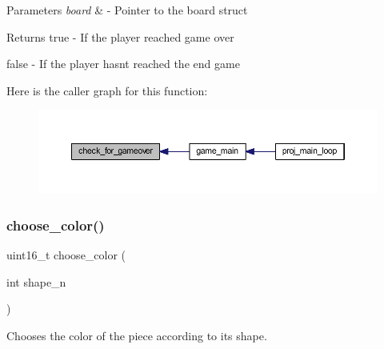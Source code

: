 \begin{DoxyParams}{Parameters}
{\em board} & -\/ Pointer to the board struct \\
\hline
\end{DoxyParams}
\begin{DoxyReturn}{Returns}
true -\/ If the player reached game over 

false -\/ If the player hasn\textquotesingle{}t reached the end game 
\end{DoxyReturn}
Here is the caller graph for this function\+:
\nopagebreak
\begin{figure}[H]
\begin{center}
\leavevmode
\includegraphics[width=350pt]{group__tetramino_gaed055860f4584eb217234f06c29d3ab4_icgraph}
\end{center}
\end{figure}
\mbox{\label{group__tetramino_gaec1f53f8b300eba51c8863f3fcb5478b}} 
\subsubsection{\texorpdfstring{choose\+\_\+color()}{choose\_color()}}
{\footnotesize\ttfamily uint16\+\_\+t choose\+\_\+color (\begin{DoxyParamCaption}\item[{int}]{shape\+\_\+n }\end{DoxyParamCaption})}



Chooses the color of the piece according to its shape. 



